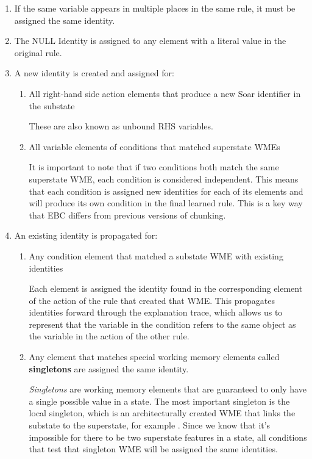 \begin{enumerate}
	\item If the same variable appears in multiple places in the same rule, it must be assigned the same identity.

	\item The NULL Identity is assigned to any element with a literal value in the original rule.

	\item A new identity is created and assigned for:
	\begin{enumerate}
		\item All right-hand side action elements that produce a new Soar identifier in the substate
	
		These are also known as unbound RHS variables.

		\item All variable elements of conditions that matched superstate WMEs

		It is important to note that if two conditions both match the same superstate WME, each condition is considered independent.  This means that each condition is assigned new identities for each of its elements and will produce its own condition in the final learned rule.  This is a key way that EBC differs from previous versions of chunking.
	\end{enumerate}
	\item An existing identity is propagated for:

	\begin{enumerate}
		\item Any condition element that matched a substate WME with existing identities

		Each element is assigned the identity found in the corresponding element of the action of the rule that created that WME.  This propagates identities forward through the explanation trace, which allows us to represent that the variable in the condition refers to the same object as the variable in the action of the other rule.

		\item Any element that matches special working memory elements called \textbf{singletons} are assigned the same identity.

		\label{CHUNKING-singletons1}
		\textit{Singletons} are working memory elements that are guaranteed to only have a single possible value in a state.  The most important singleton is the local  singleton, which is an architecturally created WME that links the substate to the superstate, for example .  Since we know that it's impossible for there to be two superstate features in a state, all conditions that test that singleton WME will be assigned the same identities.


\end{enumerate}
\end{enumerate}
